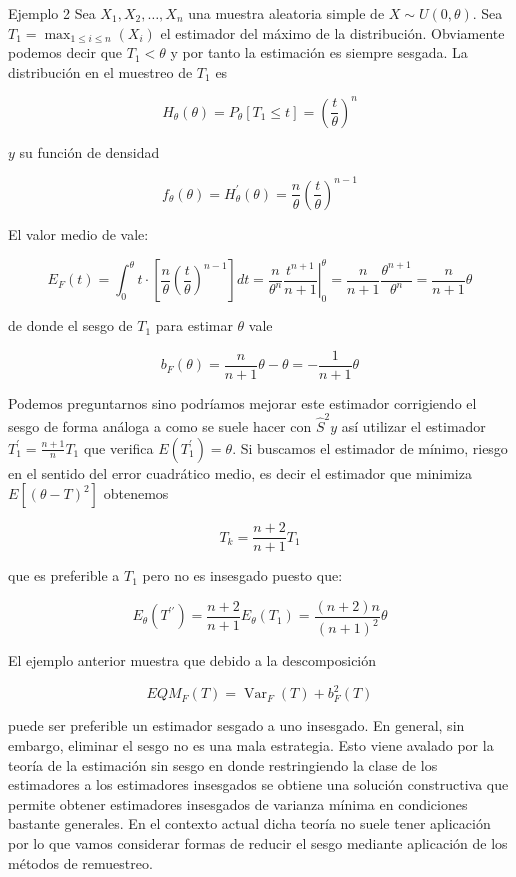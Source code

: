 \documentclass[
]{article}
\begin{document}
Ejemplo 2 Sea \(X_{1}, X_{2}, \ldots, X_{n}\) una muestra aleatoria simple de \(X \sim U(0, \theta)\). Sea \(T_{1}=\max_{1 \leq i \leq n}\left(X_{i}\right)\) el estimador del máximo de la distribución. Obviamente podemos decir que \(T_{1}<\theta\) y por tanto la estimación es siempre sesgada. La distribución en el muestreo de \(T_{1}\) es

\[
H_{\theta}(\theta)=P_{\theta}\left[T_{1} \leq t\right]=\left(\frac{t}{\theta}\right)^{n}
\]

\(y\) su función de densidad

\[
f_{\theta}(\theta)=H_{\theta}^{\prime}(\theta)=\frac{n}{\theta}\left(\frac{t}{\theta}\right)^{n-1}
\]

El valor medio de vale:

\[
E_{F}(t)=\int_{0}^{\theta} t \cdot\left[\frac{n}{\theta}\left(\frac{t}{\theta}\right)^{n-1}\right] d t=\left.\frac{n}{\theta^{n}} \frac{t^{n+1}}{n+1}\right|_{0} ^{\theta}=\frac{n}{n+1} \frac{\theta^{n+1}}{\theta^{n}}=\frac{n}{n+1} \theta
\]

de donde el sesgo de \(T_{1}\) para estimar \(\theta\) vale

\[
b_{F}(\theta)=\frac{n}{n+1} \theta-\theta=-\frac{1}{n+1} \theta
\]

Podemos preguntarnos sino podríamos mejorar este estimador corrigiendo el sesgo de forma análoga a como se suele hacer con \(\hat{S}^{2} y\) así utilizar el estimador \(T_{1}^{\prime}=\frac{n+1}{n} T_{1}\) que verifica \(E\left(T_{1}^{\prime}\right)=\theta\). Si buscamos el estimador de mínimo, riesgo en el sentido del error cuadrático medio, es decir el estimador que minimiza \(E\left[(\theta-T)^{2}\right]\) obtenemos

\[
T_{k}=\frac{n+2}{n+1} T_{1}
\]

que es preferible a \(T_{1}\) pero no es insesgado puesto que:

\[
E_{\theta}\left(T^{\prime \prime}\right)=\frac{n+2}{n+1} E_{\theta}\left(T_{1}\right)=\frac{(n+2) n}{(n+1)^{2}} \theta
\]

El ejemplo anterior muestra que debido a la descomposición

\[
E Q M_{F}(T)=\operatorname{Var}_{F}(T)+b_{F}^{2}(T)
\]

puede ser preferible un estimador sesgado a uno insesgado.
En general, sin embargo, eliminar el sesgo no es una mala estrategia. Esto viene avalado por la teoría de la estimación sin sesgo en donde restringiendo la clase de los estimadores a los estimadores insesgados se obtiene una solución constructiva que permite obtener estimadores insesgados de varianza mínima en condiciones bastante generales. En el contexto actual dicha teoría no suele tener aplicación por lo que vamos considerar formas de reducir el sesgo mediante aplicación de los métodos de remuestreo.
\end{document}
